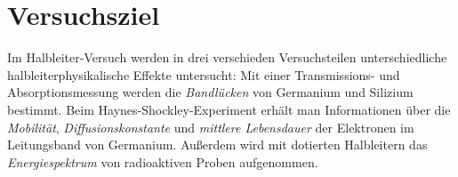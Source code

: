 \section{Versuchsziel}
Im Halbleiter-Versuch werden in drei verschieden Versuchsteilen unterschiedliche
halbleiterphysikalische Effekte untersucht:
Mit einer Transmissions- und Absorptionsmessung werden die \emph{Bandlücken} von Germanium und Silizium bestimmt.
Beim Haynes-Shockley-Experiment erhält man Informationen über die \emph{Mobilität}, \emph{Diffusionskonstante} und
\emph{mittlere Lebensdauer} der Elektronen im Leitungsband von Germanium.
Außerdem wird mit dotierten Halbleitern das \emph{Energiespektrum} von radioaktiven Proben aufgenommen.